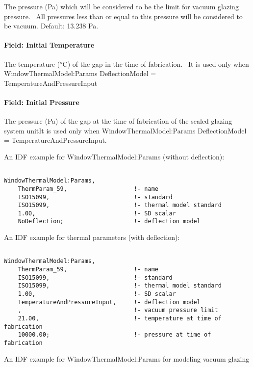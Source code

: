 The pressure (Pa) which will be considered to be the limit for vacuum glazing pressure.~ All pressures less than or equal to this pressure will be considered to be vacuum. Default: 13.238 Pa.

\paragraph{Field: Initial Temperature}\label{field-initial-temperature}

The temperature (\(^{o}\)C) of the gap in the time of fabrication.~ It is used only when WindowThermalModel:Params DeflectionModel = TemperatureAndPressureInput

\paragraph{Field: Initial Pressure}\label{field-initial-pressure}

The pressure (Pa) of the gap at the time of fabrication of the sealed glazing system unitIt is used only when WindowThermalModel:Params DeflectionModel = TemperatureAndPressureInput.

An IDF example for WindowThermalModel:Params (without deflection):

\begin{lstlisting}

WindowThermalModel:Params,
    ThermParam_59,                   !- name
    ISO15099,                        !- standard
    ISO15099,                        !- thermal model standard
    1.00,                            !- SD scalar
    NoDeflection;                    !- deflection model
\end{lstlisting}

An IDF example for thermal parameters (with deflection):

\begin{lstlisting}

WindowThermalModel:Params,
    ThermParam_59,                   !- name
    ISO15099,                        !- standard
    ISO15099,                        !- thermal model standard
    1.00,                            !- SD scalar
    TemperatureAndPressureInput,     !- deflection model
    ,                                !- vacuum pressure limit
    21.00,                           !- temperature at time of fabrication
    10000.00;                        !- pressure at time of fabrication
\end{lstlisting}

An IDF example for WindowThermalModel:Params for modeling vacuum glazing

